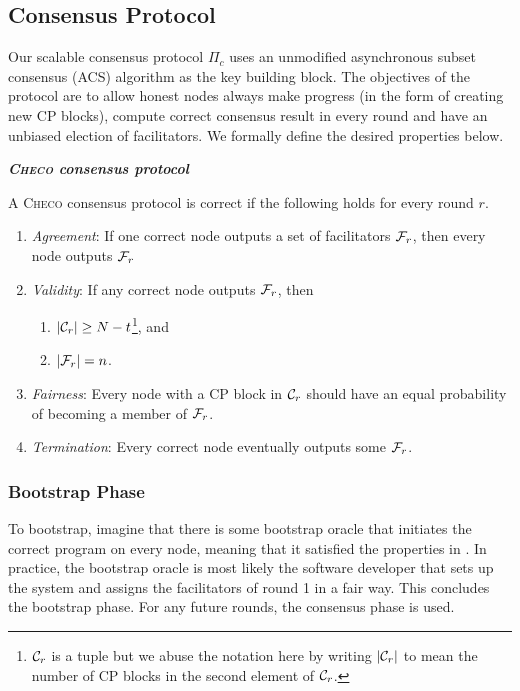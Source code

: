 \subsection{Consensus Protocol}
Our scalable consensus protocol $\Pi_c$ uses an unmodified asynchronous subset consensus (ACS) algorithm as the key building block.
The objectives of the protocol are to
allow honest nodes always make progress (in the form of creating new CP blocks),
compute correct consensus result in every round
and have an unbiased election of facilitators.
We formally define the desired properties below.
\begin{definition}
\label{def:consensus}
\textbf{\emph{\textsc{Checo} consensus protocol}}

A \textsc{Checo} consensus protocol is correct if the following holds for every round $r$.
\begin{enumerate}
    \item \emph{Agreement}:
        If one correct node outputs a set of facilitators $\mathcal{F}_r$,
        then every node outputs $\mathcal{F}_r$
    \item \emph{Validity}:
        If any correct node outputs $\mathcal{F}_r$, then 
            \begin{enumerate}
                \item $|\mathcal{C}_r| \ge N - t$\footnote{
                $\mathcal{C}_r$ is a tuple but we abuse the notation here by writing $|\mathcal{C}_r|$ to mean the number of CP blocks in the second element of $\mathcal{C}_r$.}, and
                \item $|\mathcal{F}_r| = n$.
            \end{enumerate}
    \item \emph{Fairness}:
        Every node with a CP block in $\mathcal{C}_r$ should have an equal probability of becoming a member of $\mathcal{F}_r$.
    \item \emph{Termination}:
        Every correct node eventually outputs some $\mathcal{F}_r$.
\end{enumerate}
\end{definition}

\subsubsection{Bootstrap Phase}
\label{sec:bootstrap}
To bootstrap, imagine that there is some bootstrap oracle that initiates the correct program on every node,
meaning that it satisfied the properties in .
In practice, the bootstrap oracle is most likely the software developer that sets up the system and assigns the facilitators of round 1 in a fair way.
This concludes the bootstrap phase.
For any future rounds, the consensus phase is used.

